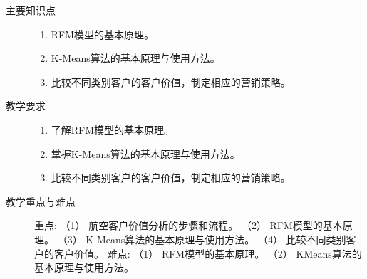 \documentclass[12pt,a4paper,openany,cap]{ctexbook}
\begin{document}
\begin{description}
\item[主要知识点]
  \begin{minipage}[t]{0.8\linewidth}
    \begin{enumerate}
    \item  RFM模型的基本原理。
\item\label{item:194}  K-Means算法的基本原理与使用方法。
\item\label{item:195}  比较不同类别客户的客户价值，制定相应的营销策略。
  
    \end{enumerate}
  \end{minipage}

\item[教学要求]
  \begin{minipage}[t]{0.8\linewidth}
    \begin{enumerate}
    \item  了解RFM模型的基本原理。
\item\label{item:196}  掌握K-Means算法的基本原理与使用方法。
\item\label{item:197}  比较不同类别客户的客户价值，制定相应的营销策略。
    \end{enumerate}
  \end{minipage}

  \item[教学重点与难点]  重点:
    （1） 航空客户价值分析的步骤和流程。
    （2） RFM模型的基本原理。
    （3） K-Means算法的基本原理与使用方法。
    （4） 比较不同类别客户的客户价值。
 难点:
    （1） RFM模型的基本原理。
    （2） KMeans算法的基本原理与使用方法。
    

\end{description}
\end{document}
